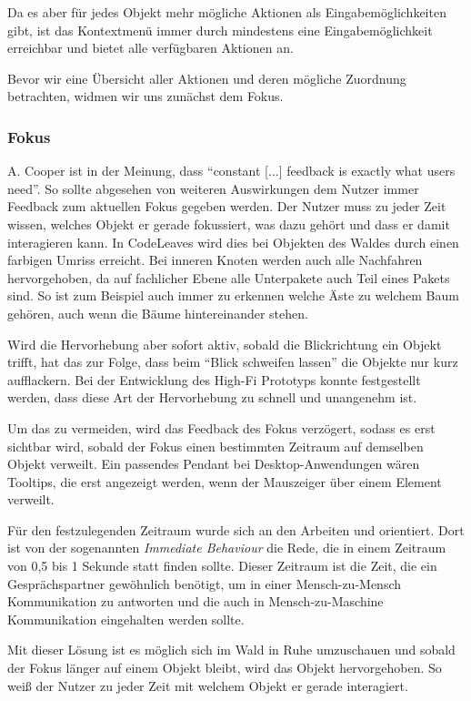 Da es aber für jedes Objekt mehr mögliche Aktionen als Eingabemöglichkeiten gibt, ist das Kontextmenü immer durch mindestens eine Eingabemöglichkeit erreichbar und bietet alle verfügbaren Aktionen an.

Bevor wir eine Übersicht aller Aktionen und deren mögliche Zuordnung betrachten, widmen wir uns zunächst dem Fokus.

\subsubsection*{Fokus}

A. Cooper ist in \cite{cooper2014face} der Meinung, dass ``constant [...] feedback is exactly what users need''. So sollte abgesehen von weiteren Auswirkungen dem Nutzer immer Feedback zum aktuellen Fokus gegeben werden. Der Nutzer muss zu jeder Zeit wissen, welches Objekt er gerade fokussiert, was dazu gehört und dass er damit interagieren kann. In CodeLeaves wird dies bei Objekten des Waldes durch einen farbigen Umriss erreicht. Bei inneren Knoten werden auch alle Nachfahren hervorgehoben, da auf fachlicher Ebene alle Unterpakete auch Teil eines Pakets sind. So ist zum Beispiel auch immer zu erkennen welche Äste zu welchem Baum gehören, auch wenn die Bäume hintereinander stehen.

Wird die Hervorhebung aber sofort aktiv, sobald die Blickrichtung ein Objekt trifft, hat das zur Folge, dass beim "`Blick schweifen lassen"' die Objekte nur kurz aufflackern. Bei der Entwicklung des High-Fi Prototyps konnte festgestellt werden, dass diese Art der Hervorhebung zu schnell und unangenehm ist.

Um das zu vermeiden, wird das Feedback des Fokus verzögert, sodass es erst sichtbar wird, sobald der Fokus einen bestimmten Zeitraum auf demselben Objekt verweilt. Ein passendes Pendant bei Desktop-Anwendungen wären Tooltips, die erst angezeigt werden, wenn der Mauszeiger über einem Element verweilt.

Für den festzulegenden Zeitraum wurde sich an den Arbeiten \cite{miller1956magical} und \cite{mishunov2015why} orientiert. Dort ist von der sogenannten \textit{Immediate Behaviour} die Rede, die in einem Zeitraum von 0,5 bis 1 Sekunde statt finden sollte. Dieser Zeitraum ist die Zeit, die ein Gesprächspartner gewöhnlich benötigt, um in einer Mensch-zu-Mensch Kommunikation zu antworten und die auch in Mensch-zu-Maschine Kommunikation eingehalten werden sollte.

Mit dieser Lösung ist es möglich sich im Wald in Ruhe umzuschauen und sobald der Fokus länger auf einem Objekt bleibt, wird das Objekt hervorgehoben. So weiß der Nutzer zu jeder Zeit mit welchem Objekt er gerade interagiert.

